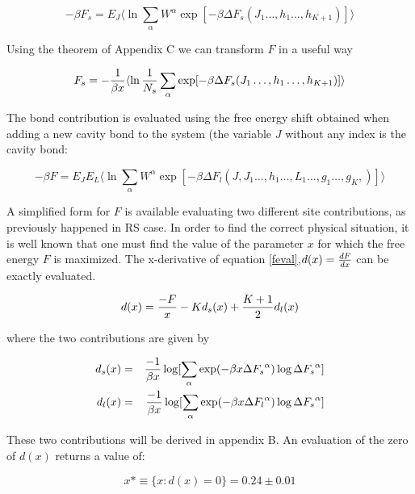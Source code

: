 \begin{equation}
-\beta F_s = E_J\langle \ln \sum_{\alpha} W^\alpha \exp[-\beta \Delta F_s(J_1\ldots,h_1\ldots,h_{K+1})] \rangle
\end{equation}

Using the theorem of Appendix C we can transform $F$ in a useful way

\begin{equation}
 F_s = -\frac{1}{\beta x} \langle \ln {1 \over N_s}\sum_{\alpha}\exp[-\beta \Delta F_s (J_1\ldots,h_1\ldots,h_{K+1})] \rangle
 \label{feval}
\end{equation}

The bond contribution is evaluated using the free energy shift obtained when adding a new cavity bond to the system (the variable $J$ without any index is the cavity bond:

\begin{equation}
-\beta F = E_JE_{L}\langle \ln \sum_{\alpha} W^\alpha \exp[-\beta \Delta F_l(J,J_1\ldots,h_1\ldots,L_1\ldots,g_1\ldots,g_{K},)] \rangle
\end{equation}


A simplified form  for $F$ is available evaluating two different site contributions, as previously happened in RS case.
In order to find the correct physical situation, it is well known \cite{wellknown} that one must find the value of the parameter $x$ for which the free energy $F$ is maximized. The x-derivative of equation \ref{feval},$d(x) = {dF \over dx}$ can be exactly evaluated.

\begin{equation}
d(x) = {-F\over x} - K d_s(x) + {K+1 \over 2} d_l(x)
\end{equation}

where the two contributions are given by

\begin{eqnarray}
d_s(x) &=& {-1\over \beta x} \log[ \sum_\alpha \exp(-\beta x \Delta {F_s}^\alpha) \log \Delta {F_s}^\alpha ]  \nonumber \\
d_l(x) &=& {-1\over \beta x} \log[ \sum_\alpha \exp(-\beta x \Delta {F_l}^\alpha) \log \Delta {F_s}^\alpha ] \nonumber
\end{eqnarray}

These two contributions will be derived in appendix B.
An evaluation of the zero of $d(x)$ returns a value of:

\begin{equation}
x* \equiv \{x:d(x)=0\} = 0.24 \pm 0.01
\label{star}
\end{equation}

